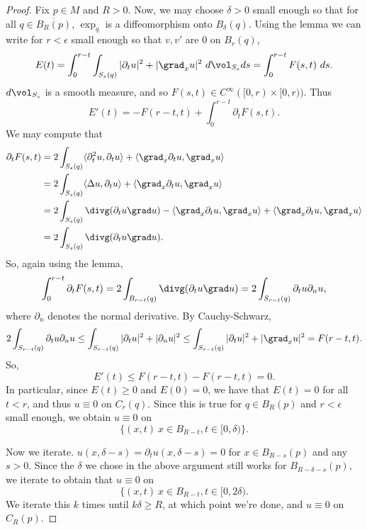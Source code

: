 \documentclass[12pt]{article}
\begin{document}
\begin{proof}
Fix $p \in M$ and $R > 0$. Now, we may choose $\delta > 0$ small enough so that for all $q \in \overline{B_R(p)}$, $\exp_q$ is a diffeomorphism onto $B_\delta(q)$.
Using the lemma we can write for $r < \epsilon$ small enough so that $v,v'$ are $0$ on $B_r(q)$,
\[E(t) = \int_0^{r-t}\int_{S_s(q)} |\partial_t u|^2 + |\grad_x u|^2\ d\vol_{S_{s}}ds = \int_0^{r-t}F(s,t)\ ds.\]
$d\vol_{S_{s}}$ is a smooth measure, and so $F(s,t) \in C^\infty([0,r)\times[0,r))$. Thus
\[E'(t) = -F(r-t,t) + \int_0^{r-t}\partial_t F(s,t).\]
We may compute that
\begin{align*}
\partial_t F(s,t) &= 2\int_{S_s(q)} \langle \partial_t^2 u,\partial_t u\rangle + \langle \grad_x \partial_t u,\grad_x u\rangle\\
&=2\int_{S_s(q)} \langle \Delta u,\partial_t u\rangle + \langle\grad_x \partial_t u,\grad_x u\rangle\\
&=2\int_{S_s(q)}\divg(\partial_t u \grad u) - \langle\grad_x \partial_t u,\grad_x u\rangle + \langle\grad_x \partial_t u,\grad_x u\rangle\\
&= 2\int_{S_s(q)}\divg(\partial_t u \grad u).\end{align*}
So, again using the lemma,
\[\int_0^{r-t}\partial_t F(s,t) = 2\int_{B_{r-t}(q)}\divg(\partial_t u \grad u) = 2\int_{S_{r-t}(q)} \partial_t u\partial_n u,\]
where $\partial_n$ denotes the normal derivative. By Cauchy-Schwarz,
\[2\int_{S_{r-t}(q)} \partial_t u\partial_n u \leq \int_{S_{r-t}(q)} |\partial_t u|^2 + |\partial_n u|^2 \leq \int_{S_{r-t}(q)} |\partial_t u|^2 + |\grad_x u|^2 = F(r-t,t).\]
So,
\[E'(t) \leq F(r-t,t)-F(r-t,t) = 0.\] In particular, since $E(t) \geq 0$ and $E(0) = 0$, we have that $E(t) = 0$ for all $t < r$, and thus $u \equiv 0$ on $C_r(q)$. Since this is true for $q \in B_R(p)$ and $r < \epsilon$ small enough, we obtain $u \equiv 0$ on
\[\{(x,t)\: x \in B_{R-t}, t \in [0,\delta)\}.\]

Now we iterate. $u(x,\delta-s) = \partial_t u(x,\delta-s) = 0$ for $x \in B_{R-s}(p)$ and any $s > 0$. Since the $\delta$ we chose in the above argument still works for $B_{R-\delta-s}(p)$, we iterate to obtain that $u \equiv 0$ on
\[\{(x,t)\: x \in B_{R-t}, t \in [0,2\delta).\] We iterate this $k$ times until $k\delta \geq R$, at which point we're done, and $u \equiv 0$ on $C_R(p)$.


\end{proof}
\end{document}
